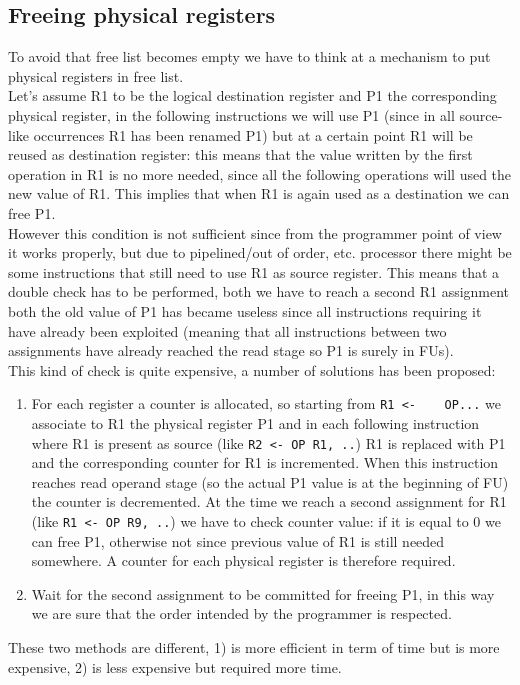 \subsection{Freeing physical registers}
To avoid that free list becomes empty we have to think at a mechanism to put
physical registers in free list.\\ Let's assume R1 to be the logical
destination register and P1 the corresponding physical register, in the
following instructions we will use P1 (since in all source-like occurrences R1
has been renamed P1) but at a certain point R1 will be reused as destination
register: this means that the value written by the first operation in R1 is no
more needed, since all the following operations will used the new value of R1.
This implies that when R1 is again used as a destination we can free P1.\\
However this condition is not sufficient since from the programmer point of
view it works properly, but due to pipelined/out of order, etc. processor there
might be some instructions that still need to use R1 as source register. This
means that a double check has to be performed, both we have to reach a second
R1 assignment both the old value of P1 has became useless since all
instructions requiring it have already been exploited (meaning that all
instructions between two assignments have already reached the read stage so P1
is surely in FUs).\\ This kind of check is quite expensive, a number of
solutions has been proposed:
\begin{enumerate}
  \item For each register a counter is allocated, so starting from
    \verb|R1 <-    OP...| we associate to R1 the physical register P1 and in
    each following instruction where R1 is present as source (like
    \verb|R2 <- OP R1, ..|) R1 is replaced with P1 and the corresponding
    counter for R1 is incremented.  When this instruction reaches read operand
    stage (so the actual P1 value is at the beginning of FU) the counter is
    decremented. At the time we reach a second assignment for R1 (like
    \verb|R1 <- OP R9, ..|) we have to check counter value: if it is equal to 0
    we can free P1, otherwise not since previous value of R1 is still needed
    somewhere. A counter for each physical register is therefore required.
  \item Wait for the second assignment to be committed for freeing P1, in this
    way we are sure that the order intended by the programmer is respected.
\end{enumerate}
These two methods are different, 1) is more efficient in term of time but is
more expensive, 2) is less expensive but required more time.

